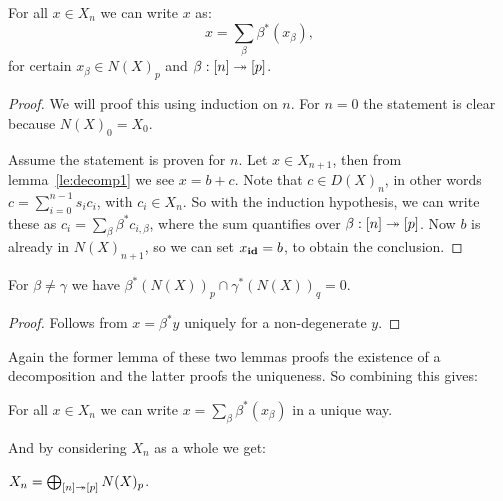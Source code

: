 \begin{lemma}
	\label{le:decomp3}
	For all $x \in X_n$ we can write $x$ as:
	$$ x = \sum_\beta \beta^\ast (x_\beta), $$
	for certain $x_\beta \in N(X)_p$ and $\beta : [n] \twoheadrightarrow [p]$.
\end{lemma}
\begin{proof}
	We will proof this using induction on $n$. For $n=0$ the statement is clear because $N(X)_0 = X_0$.

	Assume the statement is proven for $n$. Let $x \in X_{n+1}$, then from lemma~\ref{le:decomp1} we see $x = b + c$. Note that $c \in D(X)_n$, in other words $c = \sum_{i=0}^{n-1} s_i c_i$, with $c_i \in X_n$. So with the induction hypothesis, we can write these as $c_i = \sum_\beta \beta^\ast c_{i, \beta}$, where the sum quantifies over $\beta: [n] \twoheadrightarrow [p]$. Now $b$ is already in $N(X)_{n+1}$, so we can set $x_{\mathbf{id}} = b$, to obtain the conclusion.
\end{proof}
\begin{lemma}
	\label{le:decomp4}
	For $\beta \neq \gamma$ we have $\beta^\ast(N(X))_p \cap \gamma^\ast(N(X))_q = 0$.
\end{lemma}
\begin{proof}
	Follows from $x = \beta^\ast y$ uniquely for a non-degenerate $y$. 
\end{proof}

Again the former lemma of these two lemmas proofs the existence of a decomposition and the latter proofs the uniqueness. So combining this gives:

\begin{corollary}
	\label{cor:decomp}
	For all $x \in X_n$ we can write $x = \sum_\beta \beta^\ast (x_\beta)$ in a unique way.
\end{corollary}

And by considering $X_n$ as a whole we get:

\begin{corollary}
	$X_n = \bigoplus_{[n] \twoheadrightarrow [p]} N(X)_p$.
\end{corollary}

